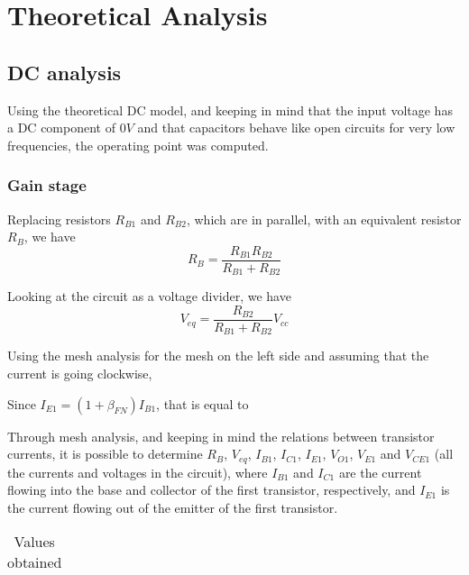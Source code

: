 \section{Theoretical Analysis}
\label{sec:analysis}




\subsection{DC analysis}
Using the theoretical DC model, and keeping in mind that the input voltage has a DC component of $0V$ and that capacitors behave like open circuits for very low frequencies, the operating point was computed.


\subsubsection{Gain stage}
Replacing resistors $R_{B1}$ and $R_{B2}$, which are in parallel, with an equivalent resistor $R_{B}$, we have
\begin{equation}
R_B = \frac{R_{B1} R_{B2}}{R_{B1}+R_{B2}}
\end{equation}

Looking at the circuit as a voltage divider, we have
\begin{equation}
V_{eq} = \frac{R_{B2}}{R_{B1}+R_{B2}} V_{cc}
\end{equation}

Using the mesh analysis for the mesh on the left side and assuming that the current is going clockwise,


Since $I_{E1} = (1 + \beta_{FN}) I_{B1}$, that is equal to 


Through mesh analysis, and keeping in mind the relations between transistor currents, it is possible to determine $R_B$, $V_{eq}$, $I_{B1}$, $I_{C1}$, $I_{E1}$, $V_{O1}$, $V_{E1}$ and $V_{CE1}$ (all the currents and voltages in the circuit), where $I_{B1}$ and $I_{C1}$ are the current flowing into the base and collector of the first transistor, respectively, and $I_{E1}$ is the current flowing out of the emitter of the first transistor.


\begin{table}[H]
  \centering
  \begin{tabular}{|c|c|}
    \hline
      
  \end{tabular}
  \caption{Values obtained}
  \label{tab:resultsDC1}
\end{table}



